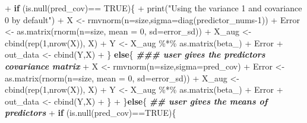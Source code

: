 \documentclass[
]{article}
\newenvironment{Shaded}{\begin{snugshade}}{\end{snugshade}}
\newcommand{\AttributeTok}[1]{\textcolor[rgb]{0.77,0.63,0.00}{#1}}
\newcommand{\ConstantTok}[1]{\textcolor[rgb]{0.00,0.00,0.00}{#1}}
\newcommand{\ControlFlowTok}[1]{\textcolor[rgb]{0.13,0.29,0.53}{\textbf{#1}}}
\newcommand{\DecValTok}[1]{\textcolor[rgb]{0.00,0.00,0.81}{#1}}
\newcommand{\DocumentationTok}[1]{\textcolor[rgb]{0.56,0.35,0.01}{\textbf{\textit{#1}}}}
\newcommand{\FunctionTok}[1]{\textcolor[rgb]{0.00,0.00,0.00}{#1}}
\newcommand{\NormalTok}[1]{#1}
\newcommand{\OtherTok}[1]{\textcolor[rgb]{0.56,0.35,0.01}{#1}}
\newcommand{\SpecialCharTok}[1]{\textcolor[rgb]{0.00,0.00,0.00}{#1}}
\newcommand{\StringTok}[1]{\textcolor[rgb]{0.31,0.60,0.02}{#1}}
\begin{document}
\begin{Shaded}
\begin{Highlighting}[]
\SpecialCharTok{+}       \ControlFlowTok{if}\NormalTok{ (}\FunctionTok{is.null}\NormalTok{(pred\_cov)}\SpecialCharTok{==} \ConstantTok{TRUE}\NormalTok{)\{}
\SpecialCharTok{+}         \FunctionTok{print}\NormalTok{(}\StringTok{"Using the variance 1 and covariance 0 by default"}\NormalTok{)}
\SpecialCharTok{+}\NormalTok{         X }\OtherTok{\textless{}{-}} \FunctionTok{rmvnorm}\NormalTok{(}\AttributeTok{n=}\NormalTok{size,}\AttributeTok{sigma=}\FunctionTok{diag}\NormalTok{(predictor\_nums}\DecValTok{{-}1}\NormalTok{))}
\SpecialCharTok{+}\NormalTok{         Error }\OtherTok{\textless{}{-}} \FunctionTok{as.matrix}\NormalTok{(}\FunctionTok{rnorm}\NormalTok{(}\AttributeTok{n=}\NormalTok{size, }\AttributeTok{mean =} \DecValTok{0}\NormalTok{, }\AttributeTok{sd=}\NormalTok{error\_sd))}
\SpecialCharTok{+}\NormalTok{         X\_aug }\OtherTok{\textless{}{-}} \FunctionTok{cbind}\NormalTok{(}\FunctionTok{rep}\NormalTok{(}\DecValTok{1}\NormalTok{,}\FunctionTok{nrow}\NormalTok{(X)), X)}
\SpecialCharTok{+}\NormalTok{         Y }\OtherTok{\textless{}{-}}\NormalTok{ X\_aug }\SpecialCharTok{\%*\%} \FunctionTok{as.matrix}\NormalTok{(beta\_) }\SpecialCharTok{+}\NormalTok{ Error}
\SpecialCharTok{+}\NormalTok{         out\_data }\OtherTok{\textless{}{-}} \FunctionTok{cbind}\NormalTok{(Y,X)}
\SpecialCharTok{+}\NormalTok{       \} }\ControlFlowTok{else}\NormalTok{\{ }\DocumentationTok{\#\#\# user gives the predictors covariance matrix}
\SpecialCharTok{+}\NormalTok{         X }\OtherTok{\textless{}{-}} \FunctionTok{rmvnorm}\NormalTok{(}\AttributeTok{n=}\NormalTok{size,}\AttributeTok{sigma=}\NormalTok{pred\_cov)}
\SpecialCharTok{+}\NormalTok{         Error }\OtherTok{\textless{}{-}} \FunctionTok{as.matrix}\NormalTok{(}\FunctionTok{rnorm}\NormalTok{(}\AttributeTok{n=}\NormalTok{size, }\AttributeTok{mean =} \DecValTok{0}\NormalTok{, }\AttributeTok{sd=}\NormalTok{error\_sd))}
\SpecialCharTok{+}\NormalTok{         X\_aug }\OtherTok{\textless{}{-}} \FunctionTok{cbind}\NormalTok{(}\FunctionTok{rep}\NormalTok{(}\DecValTok{1}\NormalTok{,}\FunctionTok{nrow}\NormalTok{(X)), X)}
\SpecialCharTok{+}\NormalTok{         Y }\OtherTok{\textless{}{-}}\NormalTok{ X\_aug }\SpecialCharTok{\%*\%} \FunctionTok{as.matrix}\NormalTok{(beta\_) }\SpecialCharTok{+}\NormalTok{ Error}
\SpecialCharTok{+}\NormalTok{         out\_data }\OtherTok{\textless{}{-}} \FunctionTok{cbind}\NormalTok{(Y,X)}
\SpecialCharTok{+}\NormalTok{       \}}
\SpecialCharTok{+}\NormalTok{     \}}\ControlFlowTok{else}\NormalTok{\{ }\DocumentationTok{\#\# user gives the means of predictors }
\SpecialCharTok{+}       \ControlFlowTok{if}\NormalTok{ (}\FunctionTok{is.null}\NormalTok{(pred\_cov)}\SpecialCharTok{==}\ConstantTok{TRUE}\NormalTok{)\{}

\end{Highlighting}
\end{Shaded}
\end{document}
